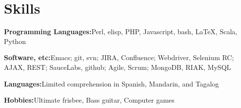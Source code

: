 \section{Skills}
%
\begin{position}
\item[] \textbf{Programming Languages:}\quad Perl, elisp, PHP, Javascript, bash, \LaTeX, Scala, Python%
\item[] \textbf{Software, etc:}\quad Emacs; git, svn; JIRA, Confluence; Webdriver, Selenium RC; AJAX, REST; SauceLabs, github; Agile, Scrum; MongoDB, RIAK, MySQL
\item[] \textbf{Languages:}\quad Limited comprehension in Spanish, Mandarin, and Tagalog
\item[] \textbf{Hobbies:}\quad Ultimate frisbee, Bass guitar, Computer games
\end{position}
